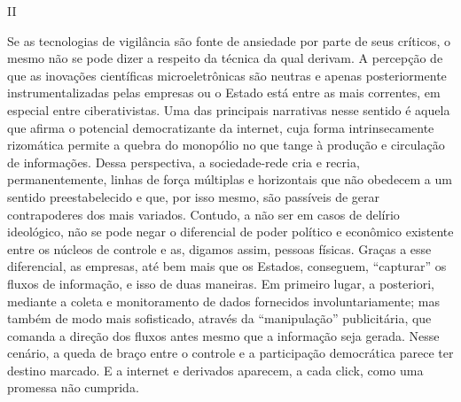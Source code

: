 \begin{center}
II
\end{center}

Se as tecnologias de vigilância são fonte de ansiedade por parte de seus
críticos, o mesmo não se pode dizer a respeito da técnica da qual
derivam. A percepção de que as inovações científicas microeletrônicas
são neutras e apenas posteriormente instrumentalizadas pelas empresas ou
o Estado está entre as mais correntes, em especial entre ciberativistas.
Uma das principais narrativas nesse sentido é aquela que afirma o
potencial democratizante da internet, cuja forma intrinsecamente
rizomática permite a quebra do monopólio no que tange à produção e
circulação de informações. Dessa perspectiva, a sociedade-rede cria e
recria, permanentemente, linhas de força múltiplas e horizontais que não
obedecem a um sentido preestabelecido e que, por isso mesmo, são
passíveis de gerar contrapoderes dos mais variados. Contudo, a não ser
em casos de delírio ideológico, não se pode negar o diferencial de poder
político e econômico existente entre os núcleos de controle e as,
digamos assim, pessoas físicas. Graças a esse diferencial, as empresas,
até bem mais que os Estados, conseguem, ``capturar'' os fluxos de
informação, e isso de duas maneiras. Em primeiro lugar, a posteriori,
mediante a coleta e monitoramento de dados fornecidos involuntariamente;
mas também de modo mais sofisticado, através da ``manipulação''
publicitária, que comanda a direção dos fluxos antes mesmo que a
informação seja gerada. Nesse cenário, a queda de braço entre o controle
e a participação democrática parece ter destino marcado. E a internet e
derivados aparecem, a cada click, como uma promessa não cumprida. ~~

